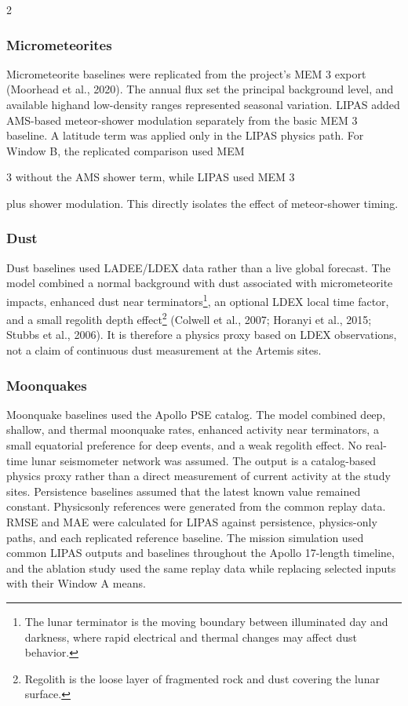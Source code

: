 \begin{multicols*}{2}
\subsubsection{Micrometeorites}

Micrometeorite baselines were replicated from the project's MEM 3 export (Moorhead et al., 2020). The annual flux set the principal background level, and available highand low-density ranges represented seasonal variation. LIPAS added AMS-based meteor-shower modulation separately from the basic MEM 3 baseline. A latitude term was applied only in the LIPAS physics path. For Window B, the replicated comparison used MEM

3 without the AMS shower term, while LIPAS used MEM 3

plus shower modulation. This directly isolates the effect of meteor-shower timing.

\subsubsection{Dust}

Dust baselines used LADEE/LDEX data rather than a live global forecast. The model combined a normal background with dust associated with micrometeorite impacts, enhanced dust near terminators\footnote{The lunar terminator is the moving boundary between illuminated day and darkness, where rapid electrical and thermal changes may affect dust behavior.}, an optional LDEX local time factor, and a small regolith depth effect\footnote{Regolith is the loose layer of fragmented rock and dust covering the lunar surface.} (Colwell et al., 2007; Horanyi et al., 2015; Stubbs et al., 2006). It is therefore a physics proxy based on LDEX observations, not a claim of continuous dust measurement at the Artemis sites.

\subsubsection{Moonquakes}

Moonquake baselines used the Apollo PSE catalog. The model combined deep, shallow, and thermal moonquake rates, enhanced activity near terminators, a small equatorial preference for deep events, and a weak regolith effect. No real-time lunar seismometer network was assumed. The output is a catalog-based physics proxy rather than a direct measurement of current activity at the study sites. Persistence baselines assumed that the latest known value remained constant. Physicsonly references were generated from the common replay data. RMSE and MAE were calculated for LIPAS against persistence, physics-only paths, and each replicated reference baseline. The mission simulation used common LIPAS outputs and baselines throughout the Apollo 17-length timeline, and the ablation study used the same replay data while replacing selected inputs with their Window A means.

\end{multicols*}
